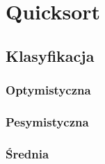 

\section{Quicksort}

\subsection{Klasyfikacja}
\subsubsection{Optymistyczna}

\subsubsection{Pesymistyczna}

\subsubsection{Średnia}


